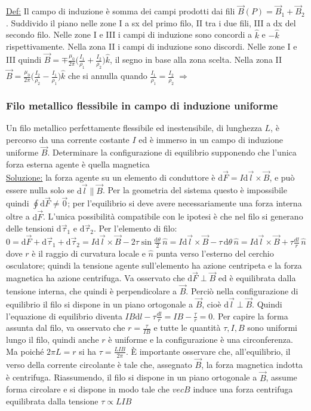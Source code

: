 \documentclass[11pt,a4paper]{article}
\begin{document}
\underline{Def:} Il campo di induzione è somma dei campi prodotti dai fili $\vec B(P)=\vec B_1+\vec B_2$. Suddivido il piano nelle zone I a sx del primo filo, II tra i due fili, III a dx del secondo filo. Nelle zone I e III i campi di induzione sono concordi a $\hat k$ e $-\hat k$ rispettivamente. Nella zona II i campi di induzione sono discordi. Nelle zone I e III quindi $\vec B=\mp\frac{\mu_0}{2\pi}\big(\frac{I_1}{\rho_1}+\frac{I_2}{\rho_2}\big)\hat k$, il segno in base alla zona scelta. Nella zona II $\vec B=\frac{\mu_0}{2\pi}\big(\frac{I_2}{\rho_2}-\frac{I_1}{\rho_1}\big)\hat k$ che si annulla quando $\frac{I_1}{\rho_1}=\frac{I_2}{\rho_2}\;\Rightarrow\;$

\subsubsection{Filo metallico flessibile in campo di induzione uniforme}
Un filo metallico perfettamente flessibile ed inestensibile, di lunghezza $L$, è percorso da una corrente costante $I$ ed è immerso in un campo di induzione uniforme $\vec B$. Determinare la configurazione di equilibrio supponendo che l'unica forza esterna agente è quella magnetica\\
\underline{Soluzione:} la forza agente su un elemento di conduttore è $\mathrm d\vec F=I\mathrm d\vec l\times\vec B$, e può essere nulla solo se $\mathrm d\vec l\parallel\vec B$. Per la geometria del sistema questo è impossibile quindi $\oint \mathrm d\vec F\neq \vec 0$; per l'equilibrio si deve avere necessariamente una forza interna  oltre a $\mathrm d\vec F$. L'unica possibilità compatibile con le ipotesi è che nel filo si generano delle tensioni $\mathrm d\vec\tau_1$ e $\mathrm d\vec\tau_2$. Per l'elemento di filo: $0=\mathrm d\vec F+\mathrm d\vec\tau_1+\mathrm d\vec\tau_2=I\mathrm d\vec l\times\vec B-2\tau\sin\frac{\mathrm d\theta}{2}\,\hat n=I\mathrm d\vec l\times\vec B-\tau\,\mathrm d\theta\,\hat n=I\mathrm d\vec l\times\vec B+\tau\frac{dl}{r}\,\hat n$ dove $r$ è il raggio di curvatura locale e $\hat n$ punta verso l'esterno del cerchio osculatore; quindi la tensione agente sull'elemento ha azione centripeta e la forza magnetica ha azione centrifuga. Va osservato che $\mathrm d\vec F\perp\vec B$ ed è equilibrata dalla tensione interna, che quindi è perpendicolare a $\vec B$. Perciò nella configurazione di equilibrio il filo si dispone in un piano ortogonale a $\vec B$, cioè $\mathrm d\vec l\perp\vec B$. Quindi l'equazione di equilibrio diventa $IB\mathrm dl-\tau\frac{dl}{r}=IB-\frac{\tau}{r}=0$. Per capire la forma assunta dal filo, va osservato che $r=\frac{\tau}{IB}$ e tutte le quantità $\tau,I,B$ sono uniformi lungo il filo, quindi anche $r$ è uniforme e la configurazione è una circonferenza. Ma poiché $2\pi L=r$ si ha $\tau=\frac{LIB}{2\pi}$. È importante osservare che, all'equilibrio, il verso della corrente circolante è tale che, assegnato $\vec B$, la forza magnetica indotta è centrifuga. Riassumendo, il filo si dispone in un piano ortogonale a $\vec B$, assume forma circolare e si dispone in modo tale che $vec B$ induce una forza centrifuga equilibrata dalla tensione $\tau\propto LIB$
\end{document}
